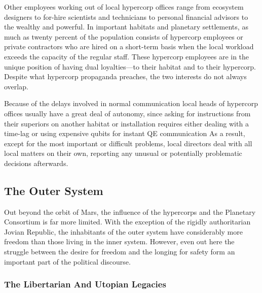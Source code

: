 Other employees working out of local hypercorp 
offices range from ecosystem designers to for-hire scientists
and technicians to personal financial advisors
to the wealthy and powerful. In important habitats 
and planetary settlements, as much as twenty percent 
of the population consists of hypercorp employees 
or private contractors who are hired on a short-term 
basis when the local workload exceeds the capacity 
of the regular staff. These hypercorp employees are 
in the unique position of having dual loyalties—to 
their habitat and to their hypercorp. Despite what 
hypercorp propaganda preaches, the two interests do 
not always overlap.

Because of the delays involved in normal communication
local heads of hypercorp offices usually
have a great deal of autonomy, since asking for instructions
from their superiors on another habitat or
installation requires either dealing with a time-lag or 
using expensive qubits for instant QE communication
As a result, except for the most important or
difficult problems, local directors deal with all local 
matters on their own, reporting any unusual or potentially
problematic decisions afterwards.

\subsection{The Outer System}

Out beyond the orbit of Mars, the influence of the 
hypercorps and the Planetary Consortium is far more 
limited. With the exception of the rigidly authoritarian 
Jovian Republic, the inhabitants of the outer system 
have considerably more freedom than those living in 
the inner system. However, even out here the struggle 
between the desire for freedom and the longing for 
safety form an important part of the political discourse.

\subsubsection{The Libertarian And Utopian Legacies}

